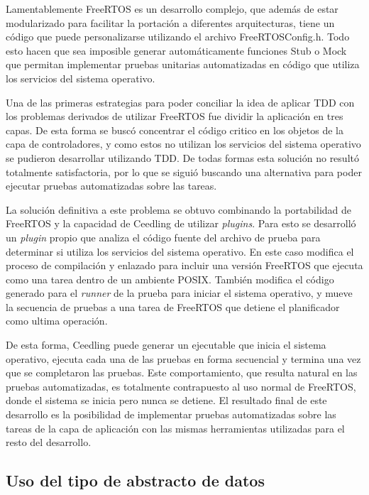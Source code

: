 Lamentablemente FreeRTOS es un desarrollo complejo, que además de estar modularizado para facilitar la portación a diferentes arquitecturas, tiene un código que puede personalizarse utilizando el archivo FreeRTOSConfig.h. Todo esto hacen que sea imposible generar automáticamente funciones Stub o Mock que permitan implementar pruebas unitarias automatizadas en código que utiliza los servicios del sistema operativo. 

Una de las primeras estrategias para poder conciliar la idea de aplicar TDD con los problemas derivados de utilizar FreeRTOS fue dividir la aplicación en tres capas. De esta forma se buscó concentrar el código critico en los objetos de la capa de controladores, y como estos no utilizan los servicios del sistema operativo se pudieron desarrollar utilizando TDD. De todas formas esta solución no resultó totalmente satisfactoria, por lo que se siguió buscando una alternativa para poder ejecutar pruebas automatizadas sobre las tareas.

La solución definitiva a este problema se obtuvo combinando la portabilidad de FreeRTOS y la capacidad de Ceedling de utilizar \emph{plugins}. Para esto se desarrolló un \emph{plugin} propio que analiza el código fuente del archivo de prueba para determinar si utiliza los servicios del sistema operativo. En este caso modifica el proceso de compilación y enlazado para incluir una versión FreeRTOS que ejecuta como una tarea dentro de un ambiente POSIX. También modifica el código generado para el \emph{runner} de la prueba para iniciar el sistema operativo, y mueve la secuencia de pruebas a una tarea de FreeRTOS que detiene el planificador como ultima operación.

De esta forma, Ceedling puede generar un ejecutable que inicia el sistema operativo, ejecuta cada una de las pruebas en forma secuencial y termina una vez que se completaron las pruebas. Este comportamiento, que resulta natural en las pruebas automatizadas, es totalmente contrapuesto al uso normal de FreeRTOS, donde el sistema se inicia pero nunca se detiene. El resultado final de este desarrollo es la posibilidad de implementar pruebas automatizadas sobre las tareas de la capa de aplicación con las mismas herramientas utilizadas para el resto del desarrollo.

\subsection{Uso del tipo de abstracto de datos}

